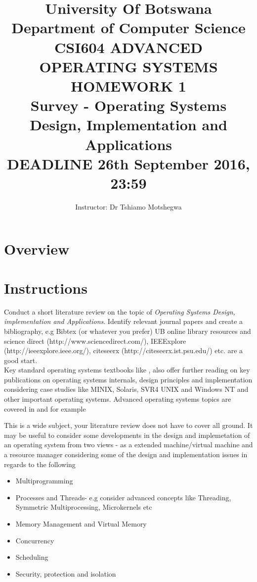 \documentclass[11pt]{article} %
\title{ {\Huge \textbf{University Of Botswana}} \\ Department of Computer Science \\ 
\vspace{1.0cm}CSI604 ADVANCED OPERATING SYSTEMS HOMEWORK 1 \\
Survey - Operating Systems Design, Implementation and Applications \\ 
DEADLINE  26th September 2016, 23:59
}
\author{Instructor: Dr Tshiamo Motshegwa}
\begin{document}
\maketitle

\section{Overview}


\section{Instructions}

\noindent Conduct  a short literature review on the topic of \textit{Operating Systems Design, implementation and Applications}. Identify relevant journal papers and create a bibliography, e.g Bibtex (or whatever you prefer) UB online library resources and science direct (http://www.sciencedirect.com/), IEEExplore (http://ieeexplore.ieee.org/), citeseerx (http://citeseerx.ist.psu.edu/) etc. are a good start.\\ 

\noindent Key standard operating systems textbooks like \cite{osDesignImpTanenbaum1997}, \cite{osInternalsAndDesignStallings1996} also offer further reading on key publications on operating systems internals, design principles and implementation considering case studies like MINIX, Solaris, SVR4 UNIX and Windows NT and other important operating systems. Advanced operating systems topics are covered in \cite{advancedOSSinghal194} and \cite{centDistOSNutt192} for example


\noindent This is a wide subject, your literature review does not have to cover all ground. It may be useful to consider some developments in the design and implemetation of an operating system from two views - as a extended machine/virtual machine and a resource manager considering some of the design and implementation issues in regards to the following
 
\begin{itemize}
\item Multiprogramming
\item Processes and Threads- e.g consider advanced concepts like Threading, Symmetric Multiprocessing, Microkernels etc
\item Memory Management and Virtual Memory
\item Concurrency
\item Scheduling
\item Security, protection and isolation
\end{itemize} 
\end{document}
